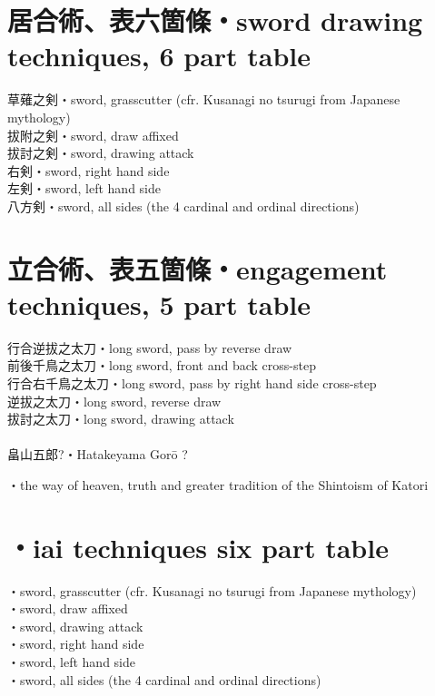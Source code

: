 \documentclass[dvipdfmx, a4paper, 12pt]{utarticle}
\begin{document}
\begin{CJK*}{UTF8}{min}
\begin{landscape}
\section{居合術、表六箇條・sword drawing techniques, 6 part table}
\noindent 草薙之剣・sword, grasscutter (cfr. Kusanagi no tsurugi from Japanese mythology)\\
拔附之剣・sword, draw affixed\\
拔討之剣・sword, drawing attack\\
右剣・sword, right hand side\\
左剣・sword, left hand side\\
八方剣・sword, all sides (the 4 cardinal and ordinal directions)\\
\section{立合術、表五箇條・engagement techniques, 5 part table}
\noindent 行合逆拔之太刀・long sword, pass by reverse draw\\
前後千鳥之太刀・long sword, front and back cross-step\\
行合右千鳥之太刀・long sword, pass by right hand side cross-step\\
逆拔之太刀・long sword, reverse draw\\
拔討之太刀・long sword, drawing attack\\
\\
畠山五郎?・Hatakeyama Gor\={o} ?


\setcounter{section}{0}
\newpage
\pagestyle{empty}
・the way of heaven, truth and greater tradition of the Shintoism of Katori\\
\section{・iai techniques six part table}
\noindent {}・sword, grasscutter (cfr. Kusanagi no tsurugi from Japanese mythology)\\
・sword, draw affixed\\
・sword, drawing attack\\
・sword, right hand side\\
・sword, left hand side\\
・sword, all sides (the 4 cardinal and ordinal directions)\\

\end{landscape}
\end{CJK*}
\end{document}
